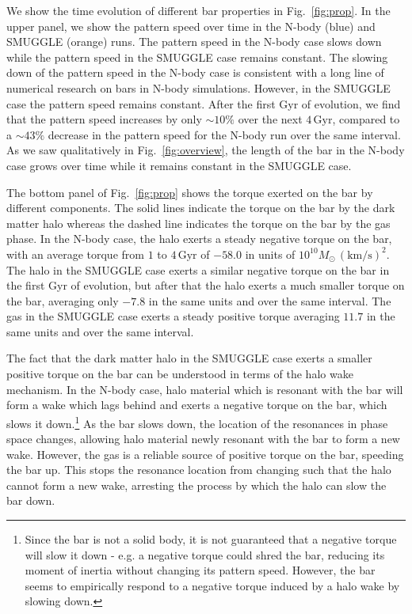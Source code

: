 \documentclass{natureprintstyle}
\begin{document}
We show the time evolution of different bar properties in Fig.~\ref{fig:prop}.
In the upper panel, we show the pattern speed over time in the N-body (blue)
and SMUGGLE (orange) runs. The pattern speed in the N-body case slows down
while the pattern speed in the SMUGGLE case remains constant. The slowing down
of the pattern speed in the N-body case is consistent with a long line of
numerical research on bars in N-body simulations\cite{1992ApJ...400...80H,
2000ApJ...543..704D, 2002MNRAS.330...35A, 2002ApJ...569L..83A,
2003MNRAS.341.1179A, 2003MNRAS.346..251O, 2005MNRAS.363..991H,
2006ApJ...637..214M, 2007MNRAS.375..460W, 2009ApJ...697..293D}. However, in
the SMUGGLE case the pattern speed remains constant. After the first Gyr of
evolution, we find that the pattern speed increases by only $\sim10\%$ over
the next $4\,\textrm{Gyr}$, compared to a $\sim43\%$ decrease in the pattern
speed for the N-body run over the same interval. As we saw
qualitatively in Fig.~\ref{fig:overview}, the length of the bar in the N-body
case grows over time while it remains constant in the SMUGGLE case.

The bottom panel of Fig.~\ref{fig:prop} shows the torque exerted on the bar by
different components. The solid lines indicate the torque on the bar by the
dark matter halo whereas the dashed line indicates the torque on the bar by
the gas phase. In the N-body case, the halo exerts a steady negative torque on
the bar, with an average torque from $1$ to $4\,\textrm{Gyr}$ of $-58.0$ in
units of $10^{10}M_{\odot}\,(\textrm{km}/\textrm{s})^2$. The halo in the
SMUGGLE case exerts a similar negative torque on the bar in the first Gyr of
evolution, but after that the halo exerts a much smaller torque on the bar,
averaging only $-7.8$ in the same units and over the same interval. The gas in
the SMUGGLE case exerts a steady positive torque averaging $11.7$ in the same
units and over the same interval.

The fact that the dark matter halo in the SMUGGLE case exerts a smaller
positive torque on the bar can be understood in terms of the halo wake
mechanism. In the N-body case, halo material which is resonant with the bar
will form a wake which lags behind and exerts a negative torque on the bar,
which slows it down.\cite{1984MNRAS.209..729T, 1985MNRAS.213..451W,
1992ApJ...400...80H}\footnote{Since the bar is not a solid body, it is not
guaranteed that a negative torque will slow it down - e.g. a negative torque
could shred the bar, reducing its moment of inertia without changing its
pattern speed. However, the bar seems to empirically respond to a negative
torque induced by a halo wake by slowing down.} As the bar slows down, the
location of the resonances in phase space changes, allowing halo material
newly resonant with the bar to form a new wake. However, the gas is a reliable
source of positive torque on the bar, speeding the bar up. This stops the
resonance location from changing such that the halo cannot form a new wake,
arresting the process by which the halo can slow the bar down.
\end{document}
